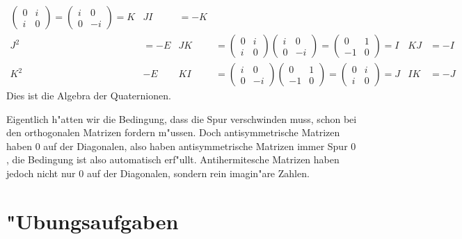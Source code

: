 \begin{beispiel}
\begin{align*}
\begin{pmatrix} 0&i \\  i& 0 \end{pmatrix}
=
\begin{pmatrix} i&0 \\  0&-i \end{pmatrix}
=
K
&
JI
&=
-K
\\
J^2
&=
-E
&
JK
&=
\begin{pmatrix} 0&i \\  i& 0 \end{pmatrix}
\begin{pmatrix} i&0 \\  0&-i \end{pmatrix}
=
\begin{pmatrix} 0&1 \\ -1& 0 \end{pmatrix}
=
I
&
KJ
&=
-I
\\
K^2
&
-E
&
KI
&=
\begin{pmatrix} i&0 \\  0&-i \end{pmatrix}
\begin{pmatrix} 0&1 \\ -1& 0 \end{pmatrix}
=
\begin{pmatrix} 0&i \\  i& 0 \end{pmatrix}
=
J
&
IK
&=
-J
\end{align*}
%
Dies ist die Algebra der Quaternionen.
\end{beispiel}

Eigentlich h"atten wir die Bedingung, dass die Spur verschwinden muss,
schon bei den orthogonalen Matrizen fordern m"ussen.
Doch antisymmetrische Matrizen haben $0$ auf der Diagonalen, also haben
antisymmetrische Matrizen immer Spur $0$, die Bedingung ist also
automatisch erf"ullt.
Antihermitesche Matrizen haben jedoch nicht nur $0$ auf der Diagonalen,
sondern rein imagin"are Zahlen.

\section*{"Ubungsaufgaben}
\begin{uebungsaufgaben}
\item

\item

\item

\item

\item

\item

\end{uebungsaufgaben}

